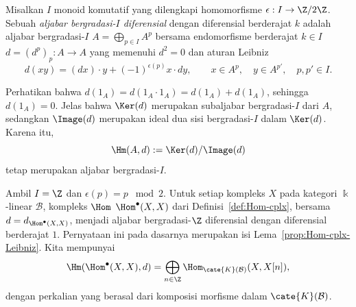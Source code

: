 \begin{definition}\label{def:dg-algebra-preview}
	Misalkan $I$ monoid komutatif yang dilengkapi homomorfisme
	$\epsilon:I\to\Z/2\Z$. Sebuah \emph{aljabar bergradasi-$I$ diferensial}
	dengan diferensial berderajat $k$ adalah aljabar bergradasi-$I$
	$A=\bigoplus_{p\in I}A^p$ bersama endomorfisme berderajat $k\in I$
	$d=(d^p)_p:A\to A$ yang memenuhi $d^2=0$ dan aturan Leibniz
	\[ d(xy)=(dx)\cdot y+(-1)^{\epsilon(p)}x\cdot dy,
	\qquad x\in A^p,\quad y\in A^{p'},\quad p,p'\in I. \]
\end{definition}

Perhatikan bahwa
$d(1_A)=d(1_A\cdot1_A)=d(1_A)+d(1_A)$, sehingga $d(1_A)=0$. Jelas bahwa
$\Ker(d)$ merupakan subaljabar bergradasi-$I$ dari $A$, sedangkan
$\Image(d)$ merupakan ideal dua sisi bergradasi-$I$ dalam $\Ker(d)$. Karena
itu,
\[ \Hm(A,d):=\Ker(d)/\Image(d) \]
tetap merupakan aljabar bergradasi-$I$.

\begin{example}
	Ambil $I=\Z$ dan $\epsilon(p)=p\;\bmod 2$. Untuk setiap kompleks $X$ pada
	kategori $\Bbbk$-linear $\mathcal{B}$, kompleks $\Hom$
	$\Hom^\bullet(X,X)$ dari Definisi~\ref{def:Hom-cplx}, bersama
	$d=d_{\Hom^\bullet(X,X)}$, menjadi aljabar bergradasi-$\Z$ diferensial
	dengan diferensial berderajat $1$. Pernyataan ini pada dasarnya merupakan
	isi Lema~\ref{prop:Hom-cplx-Leibniz}. Kita mempunyai
	\[ \Hm(\Hom^\bullet(X,X),d)=
	\bigoplus_{n\in\Z}\Hom_{\cate{K}(\mathcal{B})}(X,X[n]), \]
	dengan perkalian yang berasal dari komposisi morfisme dalam
	$\cate{K}(\mathcal{B})$.
\end{example}

